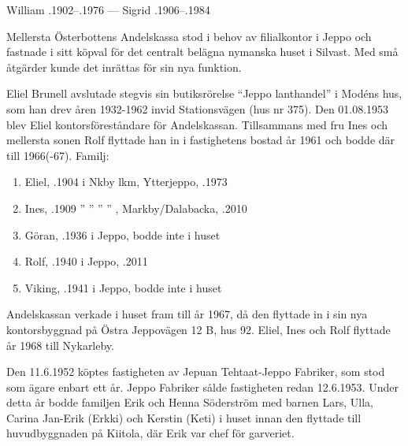 William .1902--.1976   ---   Sigrid .1906--.1984


Mellersta Österbottens Andelskassa stod i behov av filialkontor i Jeppo och fastnade i sitt köpval för det centralt belägna nymanska huset i Silvast. Med små åtgärder kunde det inrättas för sin nya funktion.

Eliel Brunell avslutade stegvis sin butiksrörelse ``Jeppo lanthandel'' i 	Modéns hus, som han drev åren 1932-1962 invid Stationsvägen (hus nr 375). Den 01.08.1953 blev Eliel kontorsföreståndare för Andelskassan. Tillsammans med fru Ines och mellersta sonen Rolf flyttade han in i fastighetens bostad år 1961 och bodde där till 1966(-67).
Familj:
\begin{enumerate}
  \item Eliel, .1904 i Nkby lkm, Ytterjeppo, .1973
  \item Ines, .1909 	'' ''   ''    ''   , Markby/Dalabacka, .2010
  \item Göran, .1936 i Jeppo, bodde inte i huset
  \item Rolf, .1940 i Jeppo, .2011
  \item Viking, .1941  i Jeppo, bodde inte i huset
\end{enumerate}
Andelskassan verkade i huset fram till år 1967, då den flyttade in i sin nya kontorsbyggnad på Östra Jeppovägen 12 B, hus 92. Eliel, Ines och Rolf flyttade år 1968 till Nykarleby.


Den 11.6.1952 köptes fastigheten av Jepuan Tehtaat-Jeppo Fabriker, som stod som ägare enbart ett år. Jeppo Fabriker sålde fastigheten redan 12.6.1953. Under detta år bodde familjen Erik och Henna Söderström med barnen Lars, Ulla, Carina Jan-Erik (Erkki) och Kerstin (Keti) i huset innan den flyttade till huvudbyggnaden på Kiitola, där Erik var chef för garveriet.


